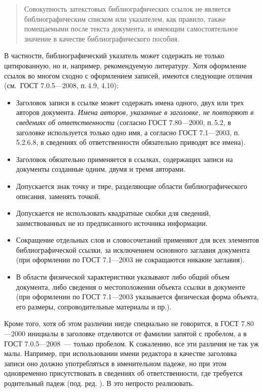 \documentclass[10pt,a4paper,headings=small,numbers=enddot,english,russian]{ltxdockit}
\newcommand*{\gostbibname}[1][]{ГОСТ#1 7.1---2003\xspace}
\newcommand*{\gostcitename}[1][]{ГОСТ#1 7.0.5---2008\xspace}
\newcommand*{\gostheadname}[1][]{ГОСТ#1 7.80---2000\xspace}
\newcommand*{\gostbibref}[2][]{\gostbibname[#1], п.\,#2\xspace}
\newcommand*{\gostciteref}[2][]{\gostcitename[#1], п.\,#2\xspace}
\newcommand*{\gostheadref}[2][]{\gostheadname[#1], п.\,#2\xspace}
\begin{document}
\begin{quotation}
Совокупность затекстовых библиографических ссылок не является библиографическим списком или
  указателем, как правило, также помещаемыми после текста документа, и имеющим самостоятельное
  значение в качестве библиографического пособия.
\end{quotation}
В частности, библиографический указатель может содержать не только цитированную, но и, например,
  рекомендуемую литературу.
Хотя оформление ссылок во многом сходно с оформлением записей, имеются следующие отличия
  (см.~\gostciteref{}{4.9, 4.10}):
\begin{itemize}
  \item Заголовок записи в ссылке может содержать имена одного, двух или трех авторов документа.
    \emph{Имена авторов, указанные в заголовке, не повторяют в сведениях об ответственности}
    (согласно \gostheadref{}{5.2}, в заголовке используется только одно имя,
    а согласно \gostbibref{}{5.2.6.8},
    в сведениях об ответственности обязательно приводят все имена).
  \item Заголовок обязательно применяется в ссылках, содержащих записи на документы созданные
    одним, двумя и тремя авторами.
  \item Допускается знак точку и тире, разделяющие области библиографического описания, заменять
    точкой.
  \item Допускается не использовать квадратные скобки для сведений, заимствованных не из
    предписанного источника информации.
  \item Сокращение отдельных слов и словосочетаний применяют для всех элементов библиографической
    ссылки, за исключением основного заглавия документа
    (при оформлении по \gostbibname не сокращаются никакие заглавия).
  \item В области физической характеристики указывают либо общий объем документа, либо сведения о
    местоположении объекта ссылки в документе (при оформлении по \gostbibname указывается
    физическая форма объекта, его размеры, сопроводительные материалы и пр.).
\end{itemize}

Кроме того, хотя об этом различии нигде специально не говорится,
  в \gostheadname инициалы в заголовке отделяются от фамилии запятой с пробелом, а в
  \gostcitename~--- только пробелом.
К сожалению, все эти различия не так уж малы.
Например, при использовании имени редактора в качестве заголовка записи оно должно употребляться
  в именительном падеже, но при этом одновременно присутствовать в сведениях
  об ответственности, где требуется родительный падеж (под. ред. \textellipsis).
В \latex это непросто реализовать.
\end{document}
